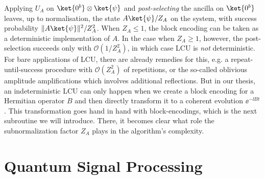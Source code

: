 Applying $U_A$ on $\ket{0^b}\otimes\ket{\psi}$ and \emph{post-selecting} the ancilla on $\ket{0^b}$ leaves, up to normalisation, the state $A \ket{\psi} / Z_A$ on the system, with success probability $\|A\ket{\psi}\|^2/Z_A^2$. When $Z_A \leq 1$, the block encoding can be taken as a deterministic implementation of $A$. In the case when $Z_A \geq 1$, however, the post-selection succeeds only with $\mathcal{O}(1 / Z_A^2)$, in which case LCU is \emph{not} deterministic. For bare applications of LCU, there are already remedies for this, e.g. a repeat-until-success procedure with $\mathcal{O}(Z_A^2)$ of repetitions, or the so-called oblivious amplitude amplifications which involves additional reflections. But in our thesis, an indeterministic LCU can only happen when we create a block encoding for a Hermitian operator $B$ and then directly transform it to a coherent evolution $\ee^{-\ii B t}$. This transformation goes hand in hand with block-encodings, which is the next subroutine we will introduce. There, it becomes clear what role the subnormalization factor $Z_A$ plays in the algorithm's complexity.

\smallskip
\section{Quantum Signal Processing} \label{sec:prelim-QSP}

